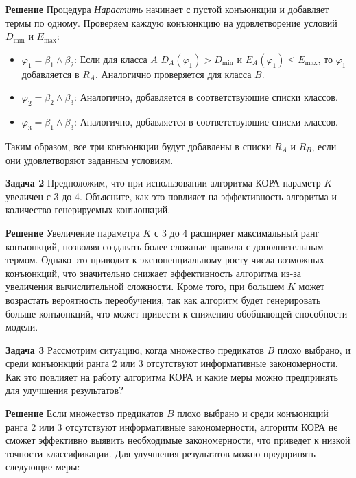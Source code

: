 \textbf{Решение}  
Процедура \textit{Нарастить} начинает с пустой конъюнкции и добавляет термы по одному. Проверяем каждую конъюнкцию на удовлетворение условий \( D_{\text{min}} \) и \( E_{\text{max}} \):

\begin{itemize}
    \item \(\varphi_1 = \beta_1 \wedge \beta_2\): Если для класса \(A\) \(D_A(\varphi_1) > D_{\text{min}}\) и \(E_A(\varphi_1) \leq E_{\text{max}}\), то \(\varphi_1\) добавляется в \( R_A \). Аналогично проверяется для класса \(B\).
    \item \(\varphi_2 = \beta_2 \wedge \beta_3\): Аналогично, добавляется в соответствующие списки классов.
    \item \(\varphi_3 = \beta_1 \wedge \beta_3\): Аналогично, добавляется в соответствующие списки классов.
\end{itemize}

Таким образом, все три конъюнкции будут добавлены в списки \( R_A \) и \( R_B \), если они удовлетворяют заданным условиям.

\textbf{Задача 2}  
Предположим, что при использовании алгоритма КОРА параметр \( K \) увеличен с 3 до 4. Объясните, как это повлияет на эффективность алгоритма и количество генерируемых конъюнкций.

\textbf{Решение}  
Увеличение параметра \( K \) с 3 до 4 расширяет максимальный ранг конъюнкций, позволяя создавать более сложные правила с дополнительным термом. Однако это приводит к экспоненциальному росту числа возможных конъюнкций, что значительно снижает эффективность алгоритма из-за увеличения вычислительной сложности. Кроме того, при большем \( K \) может возрастать вероятность переобучения, так как алгоритм будет генерировать больше конъюнкций, что может привести к снижению обобщающей способности модели.

\textbf{Задача 3}  
Рассмотрим ситуацию, когда множество предикатов \( B \) плохо выбрано, и среди конъюнкций ранга 2 или 3 отсутствуют информативные закономерности. Как это повлияет на работу алгоритма КОРА и какие меры можно предпринять для улучшения результатов?

\textbf{Решение}  
Если множество предикатов \( B \) плохо выбрано и среди конъюнкций ранга 2 или 3 отсутствуют информативные закономерности, алгоритм КОРА не сможет эффективно выявить необходимые закономерности, что приведет к низкой точности классификации. Для улучшения результатов можно предпринять следующие меры:

